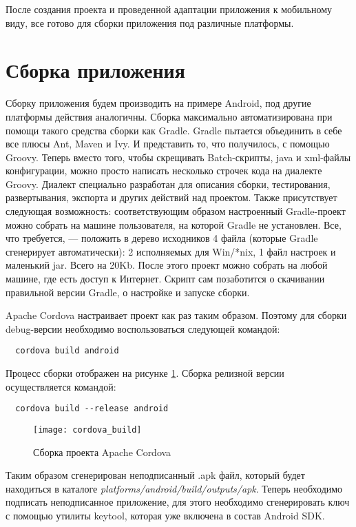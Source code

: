 После создания проекта и проведенной адаптации приложения к мобильному виду, все готово для сборки приложения под различные платформы.

\section{Сборка приложения}

Сборку приложения будем производить на примере Android, под другие платформы действия аналогичны. Сборка максимально автоматизирована при помощи такого средства сборки как Gradle. Gradle пытается объединить в себе все плюсы Ant, Maven и Ivy. И представить то, что получилось, с помощью Groovy. Теперь вместо того, чтобы скрещивать Batch-скрипты, java и xml-файлы конфигурации, можно просто написать несколько строчек кода на диалекте Groovy. Диалект специально разработан для описания сборки, тестирования, развертывания, экспорта и других действий над проектом. Также присутствует следующая возможность: соответствующим образом настроенный Gradle-проект можно собрать на машине пользователя, на которой Gradle не установлен. Все, что требуется, --- положить в дерево исходников 4 файла (которые Gradle сгенерирует автоматически): 2 исполняемых для Win/*nix, 1 файл настроек и маленький jar. Всего на 20Kb. После этого проект можно собрать на любой машине, где есть доступ к Интернет. Скрипт сам позаботится о скачивании правильной версии Gradle, о настройке и запуске сборки\cite{android:publish}.

Apache Cordova настраивает проект как раз таким образом. Поэтому для сборки debug-версии необходимо воспользоваться следующей командой:
\begin{lstlisting}
  cordova build android
\end{lstlisting}

Процесс сборки отображен на рисунке \ref{cordova_build}. Сборка релизной версии осуществляется командой:
\begin{lstlisting}
  cordova build --release android
\end{lstlisting}

\begin{figure}[ht]
\center\texttt{[image: cordova\_build]}
\caption{Сборка проекта Apache Cordova}\label{cordova_build}
\end{figure}

Таким образом сгенерирован неподписанный .apk файл, который будет находиться в каталоге \textit{platforms/android/build/outputs/apk}. Теперь необходимо подписать неподписанное приложение, для этого необходимо сгенерировать ключ с помощью утилиты keytool, которая уже включена в состав Android SDK.

